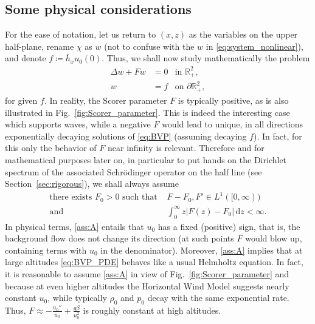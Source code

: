 \documentclass[11pt,twoside,reqno,centertags]{amsart}
\theoremstyle{definition}
\newcommand{\R}{\mathbb R}
\newcommand{\dd}{\mathrm d}
\begin{document}
\subsection{Some physical considerations}
For the ease of notation, let us return to $(x,z)$ as the variables on the upper half-plane, rename $\chi$ as $w$ (not to confuse with the $w$ in \eqref{eq:system_nonlinear}), and denote $f\coloneqq\bar h_x u_0(0)$. Thus, we shall now study mathematically the problem
\begin{subequations}\label{eq:BVP}
	\begin{align}
		\Delta w+Fw &= 0 & \text{in }\R^2_+,\label{eq:BVP_PDE}\\
		w &= f & \text{on }\partial\R^2_+,\label{eq:BVP_BC}
	\end{align}
\end{subequations}
for given $f$. In reality, the Scorer parameter $F$ is typically positive, as is also illustrated in Fig.~\ref{fig:Scorer_parameter}. This is indeed the interesting case which supports waves, while a negative $F$ would lead to unique, in all directions exponentially decaying solutions of \eqref{eq:BVP} (assuming decaying $f$). In fact, for this only the behavior of $F$ near infinity is relevant. Therefore and for mathematical purposes later on, in particular to put hands on the Dirichlet spectrum of the associated Schrödinger operator on the half line (see Section~\ref{sec:rigorous}), we shall always assume
\begin{align}
	\text{there exists }F_0 > 0 \text{ such that }& F-F_0, F' \in L^1([0,\infty))\nonumber\\
	\text{and }&\int_0^\infty z|F(z)-F_0|\,\dd z<\infty.\tag{A}\label{ass:A}
\end{align}
In physical terms, \eqref{ass:A} entails that $u_0$ has a fixed (positive) sign, that is, the background flow does not change its direction (at such points $F$ would blow up, containing terms with $u_0$ in the denominator). Moreover, \eqref{ass:A} implies that at large altitudes \eqref{eq:BVP_PDE} behaves like a usual Helmholtz equation. In fact, it is reasonable to assume \eqref{ass:A} in view of Fig.~\ref{fig:Scorer_parameter} and because at even higher altitudes the Horizontal Wind Model \cite{HWM14} suggests nearly constant $u_0$, while typically $\rho_0$ and $p_0$ decay with the same exponential rate. Thus, $F\approx-\frac{u_0''}{u_0}+\frac{g\beta}{u_0^2}$ is roughly constant at high altitudes.
\end{document}

